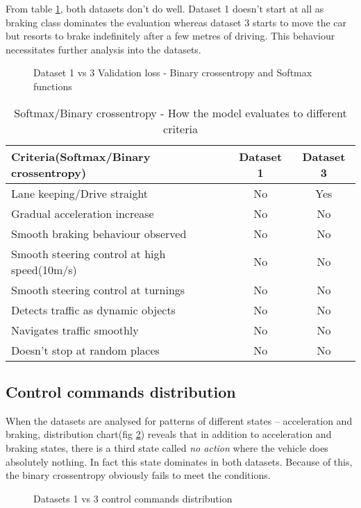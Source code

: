 From table \ref{table:softmaxandbce}, both datasets don't do well. Dataset 1 doesn't start
at all as braking class dominates the evaluation whereas dataset 3 starts to move the car
but resorts to brake indefinitely after a few metres of driving. This behaviour
necessitates further analysis into the datasets.
\begin{figure}[!ht]
	\centering
    \def\svgwidth{\textwidth}
    
    \caption{Dataset 1 vs 3 Validation loss - Binary crossentropy and Softmax functions}
    \label{fig:ds1andd3SoftactivatonBCE}
\end{figure}

\begin{table}[h]
    \centering
\begin{tabular}{lcc}
    \toprule
    Criteria(Softmax/Binary crossentropy) & Dataset 1 & Dataset 3 \\\midrule
    Lane keeping/Drive straight  & No & Yes  \\
    Gradual acceleration increase & No & No\\
    Smooth braking behaviour observed & No & No \\
    Smooth steering control at high speed(10m/s) & No & No \\
    Smooth steering control at turnings & No & No\\
    Detects traffic as dynamic objects & No & No\\
    Navigates traffic smoothly & No & No\\
    Doesn't stop at random places & No & No \\\bottomrule
\end{tabular}
\caption{Softmax/Binary crossentropy - How the model evaluates to different criteria}
\label{table:softmaxandbce}
\end{table}
\subsection*{Control commands distribution}
When the datasets are analysed for patterns of different states -- acceleration and
braking, distribution chart(fig \ref{fig:datasetscomparectrlcmds}) reveals that in addition to
acceleration and braking states, there is a third state called \textit{no action} where
the vehicle does absolutely nothing. In fact this state dominates in both datasets.
Because of this, the binary crossentropy obviously fails to meet the conditions.
\begin{figure}[!ht]
    \centering
    \def\svgwidth{\textwidth}
    
    \caption{Datasets 1 vs 3 control commands distribution}
    \label{fig:datasetscomparectrlcmds}
\end{figure}

